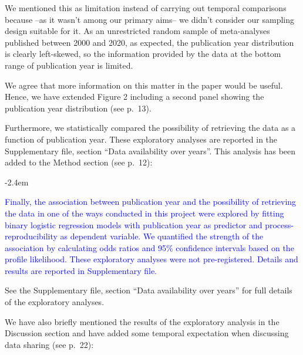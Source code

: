 \documentclass[draft]{article}
\renewenvironment{quote}{\begin{fquote}\advance\leftmargini -2.4em\begin{oldquote}}{\end{oldquote}\end{fquote}}
\newenvironment{fquote}
  {\def\FrameCommand{
	\fboxsep=0.6em %
	\fcolorbox{black}{white}}%
    \MakeFramed {\advance\hsize-2\width \FrameRestore}
    \begin{minipage}{\linewidth}
  }
  {\end{minipage}\endMakeFramed}
\begin{document}
We mentioned this as limitation instead of carrying out temporal comparisons because --as it wasn't among our primary aims-- we didn't consider our sampling design suitable for it. As an unrestricted random sample of meta-analyses published between 2000 and 2020, as expected, the publication year distribution is clearly left-skewed, so the information provided by the data at the bottom range of publication year is limited.

We agree that more information on this matter in the paper would be useful. Hence, we have extended Figure 2 including a second panel showing the publication year distribution (see p.~13).

Furthermore, we statistically compared the possibility of retrieving the data as a function of publication year. These exploratory analyses are reported in the Supplementary file, section ``Data availability over years''. This analysis has been added to the Method section (see p.~12):

\begin{quote}
\textcolor{blue}{Finally, the association between publication year and the possibility of retrieving the data in one of the ways conducted in this project were explored by fitting binary logistic regression models with publication year as predictor and process-reproducibility as dependent variable. We quantified the strength of the association by calculating odds ratios and 95\% confidence intervals based on the profile likelihood. These exploratory analyses were  not pre-registered. Details and results are reported in Supplementary file.}
\end{quote}

See the Supplementary file, section ``Data availability over years'' for full details of the exploratory analyses.

We have also briefly mentioned the results of the exploratory analysis in the Discussion section and have added some temporal expectation when discussing data sharing (see p.~22):
\end{document}
